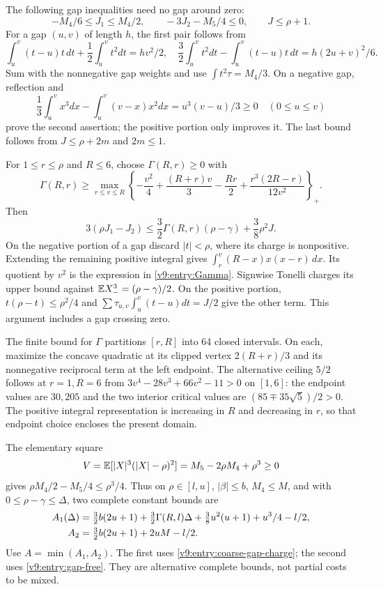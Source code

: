The following gap inequalities need no gap around zero:
\begin{equation}\label{v9:entry:gap-free}
 -M_4/6\le J_1\le M_4/2,\qquad -3J_2-M_5/4\le0,\qquad J\le\rho+1.
\end{equation}
For a gap $(u,v)$ of length $h$, the first pair follows from
\[
 \int_u^v(t-u)t\,dt+\frac12\int_u^vt^2dt=hv^2/2,
 \quad \frac32\int_u^vt^2dt-\int_u^v(t-u)t\,dt=h(2u+v)^2/6.
\]
Sum with the nonnegative gap weights and use $\int t^2\tau=M_4/3$.
On a negative gap, reflection and
\[
 \frac13\int_u^v x^3dx-\int_u^v(v-x)x^2dx=u^3(v-u)/3\ge0
 \quad(0\le u\le v)
\]
prove the second assertion; the positive portion only improves it.
The last bound follows from $J\le\rho+2m$ and $2m\le1$.

For $1\le r\le\rho$ and $R\le6$, choose $\Gamma(R,r)\ge0$ with
\begin{equation}\label{v9:entry:Gamma}
 \Gamma(R,r)\ge\max_{r\le v\le R}
 \left\{-\frac{v^2}4+\frac{(R+r)v}3-\frac{Rr}2
                  +\frac{r^3(2R-r)}{12v^2}\right\}_+.
\end{equation}
Then
\begin{equation}\label{v9:entry:coarse-gap-charge}
 3(\rho J_1-J_2)\le\frac32\Gamma(R,r)(\rho-\gamma)+\frac38\rho^2J.
\end{equation}
On the negative portion of a gap discard $|t|<\rho$, where its charge
is nonpositive. Extending the remaining positive integral gives
$\int_r^v(R-x)x(x-r)\,dx$. Its quotient by $v^2$ is the expression
in \eqref{v9:entry:Gamma}. Signwise Tonelli charges its upper bound
against $\mathbb E X_-^3=(\rho-\gamma)/2$. On the positive portion,
$t(\rho-t)\le\rho^2/4$ and
$\sum\tau_{u,v}\int_u^v(t-u)dt=J/2$ give the other term.
This argument includes a gap crossing zero.

The finite bound for $\Gamma$ partitions $[r,R]$ into 64 closed
intervals. On each, maximize the concave quadratic at its clipped vertex
$2(R+r)/3$ and its nonnegative reciprocal term at the left endpoint.
The alternative ceiling $5/2$ follows at $r=1,R=6$ from
$3v^4-28v^3+66v^2-11>0$ on $[1,6]$: the endpoint values are $30,205$
and the two interior critical values are $(85\mp35\sqrt5)/2>0$.
The positive integral representation is increasing in $R$ and decreasing
in $r$, so that endpoint choice encloses the present domain.

The elementary square
\[
 V=\mathbb E[|X|^3(|X|-\rho)^2]=M_5-2\rho M_4+\rho^3\ge0
\]
gives $\rho M_4/2-M_5/4\le\rho^3/4$. Thus on
$\rho\in[l,u]$, $|\beta|\le b$, $M_4\le M$, and with
$0\le\rho-\gamma\le\Delta$, two complete constant bounds are
\begin{align}
 A_1(\Delta)&=\tfrac32b(2u+1)+\tfrac32\Gamma(R,l)\Delta
              +\tfrac38u^2(u+1)+u^3/4-l/2,\notag\\
 A_2&=\tfrac32b(2u+1)+2uM-l/2.\label{v9:entry:coarse-A}
\end{align}
Use $A=\min(A_1,A_2)$. The first uses
\eqref{v9:entry:coarse-gap-charge}; the second uses
\eqref{v9:entry:gap-free}. They are alternative complete bounds, not
partial costs to be mixed.

